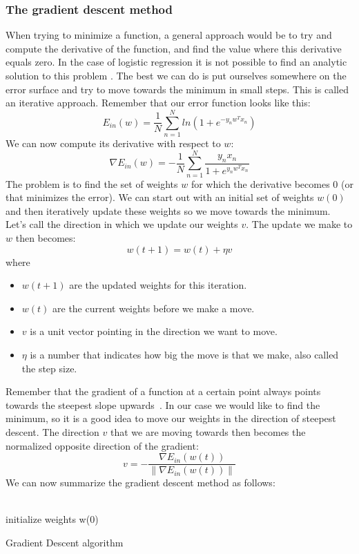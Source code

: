 \subsubsection{The gradient descent method}
\label{subsubsec:glm-gradient-descent}
When trying to minimize a function, a general approach would be to try and compute the derivative of the function, and find the value where this derivative equals zero. In the case of logistic regression it is not possible to find an analytic solution to this problem \cite{caltechmachinelearning}. The best we can do is put ourselves somewhere on the error surface and try to move towards the minimum in small steps. This is called an iterative approach. Remember that our error function looks like this:
$$
E_{in}(w) = \frac{1}{N}\sum_{n=1}^{N}ln(1+e^{-y_{n}w^{T}x_{n}})
$$
We can now compute its derivative with respect to $w$:
$$
\nabla E_{in}(w) = -\frac{1}{N}\sum_{n=1}^{N}\frac{y_{n}x_{n}}{1+e^{y_{n}w^{T}x_{n}}}
$$
The problem is to find the set of weights $w$ for which the derivative becomes 0 (or that minimizes the error). We can start out with an initial set of weights $w(0)$ and then iteratively update these weights so we move towards the minimum. Let's call the direction in which we update our weights $v$. The update we make to $w$ then becomes:
$$
w(t+1) = w(t) + \eta v
$$
where
\begin{itemize}
	\item $w(t+1)$ are the updated weights for this iteration.
	\item $w(t)$ are the current weights before we make a move.
	\item $v$ is a unit vector pointing in the direction we want to move.
	\item $\eta$ is a number that indicates how big the move is that we make, also called the step size.
\end{itemize}
Remember that the gradient of a function at a certain point always points towards the steepest slope upwards~\cite{gradientdirection}\cite{gradientdirection2}. In our case we would like to find the minimum, so it is a good idea to move our weights in the direction of steepest descent. The direction $v$ that we are moving towards then becomes the normalized opposite direction of the gradient:
$$
v = -\frac{\nabla E_{in}(w(t))}{\lVert\nabla E_{in}(w(t))\rVert}
$$
We can now summarize the gradient descent method as follows: \\ \\
\begin{algorithm}[H]
	initialize weights w(0) \\
\caption{Gradient Descent algorithm}
\end{algorithm}

